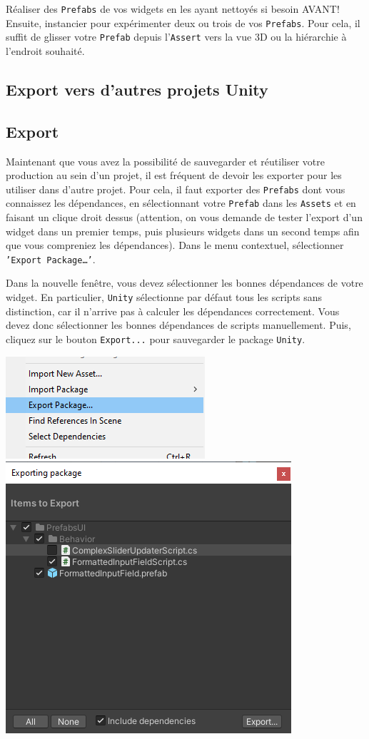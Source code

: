 \documentclass[a4paper,10pt]{article}
\begin{document}
Réaliser des \texttt{Prefabs} de vos widgets en les ayant nettoyés si besoin AVANT! Ensuite, instancier pour expérimenter deux ou trois de vos \texttt{Prefabs}. Pour cela, il suffit de glisser votre \texttt{Prefab} depuis l'\texttt{Assert} vers la vue 3D ou la hiérarchie à l'endroit souhaité.

\subsection{Export vers d'autres projets Unity}

\subsection{Export}

Maintenant que vous avez la possibilité de sauvegarder et réutiliser votre production au sein d'un projet, il est fréquent de devoir les exporter pour les utiliser dans d'autre projet. 
Pour cela, il faut exporter des \texttt{Prefabs} dont vous connaissez les dépendances, en sélectionnant votre \texttt{Prefab} dans les \texttt{Assets} et en faisant un clique droit dessus (attention, on vous demande de tester l'export d'un widget dans un premier temps, puis plusieurs widgets dans un second temps afin que vous compreniez les dépendances). Dans le menu contextuel, sélectionner \texttt{'Export Package\ldots'}.

Dans la nouvelle fenêtre, vous devez sélectionner les bonnes dépendances de votre widget. En particulier, \texttt{Unity} sélectionne par défaut tous les scripts sans distinction, car il n'arrive pas à calculer les dépendances correctement. Vous devez donc sélectionner les bonnes dépendances de scripts manuellement. Puis, cliquez sur le bouton \texttt{Export...} pour sauvegarder le package \texttt{Unity}.

\begin{center}
\hfill \includegraphics[width=0.35\linewidth]{rc/unity_set_ui_export_package}
\hfill \includegraphics[width=0.5\linewidth]{rc/unity_set_ui_export_prefab_deps}
\hfill 
\end{center}
\end{document}
